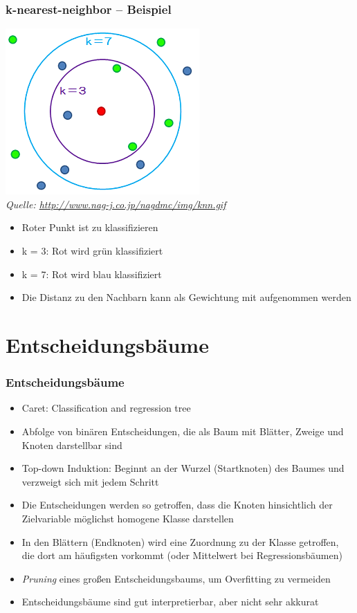 \documentclass{beamer}
\begin{document}
\begin{frame}
  \frametitle{k-nearest-neighbor -- Beispiel}  
\includegraphics[scale=.4]{knn.png} \\
\flushleft
\emph{\tiny Quelle: \url{http://www.nag-j.co.jp/nagdmc/img/knn.gif}}
\normalsize
 \begin{itemize}
  \item Roter Punkt ist zu klassifizieren
  \item k = 3: Rot wird grün klassifiziert 
  \item k = 7: Rot wird blau klassifiziert 
  \item Die Distanz zu den Nachbarn kann als Gewichtung mit aufgenommen werden
  \end{itemize}  
\end{frame}

\section{Entscheidungsbäume}

\begin{frame}
  \frametitle{Entscheidungsbäume}  
  \begin{itemize}
  \item Caret: Classification and regression tree
  \item Abfolge von binären Entscheidungen, die als Baum mit Blätter, Zweige und Knoten darstellbar sind
  \item Top-down Induktion: Beginnt an der Wurzel (Startknoten) des Baumes und verzweigt sich mit jedem Schritt
  \item Die Entscheidungen werden so getroffen, dass die Knoten hinsichtlich der Zielvariable möglichst homogene Klasse darstellen
  \item In den Blättern (Endknoten) wird eine Zuordnung zu der Klasse getroffen, die dort am häufigsten vorkommt (oder Mittelwert bei Regressionsbäumen)
   \item \emph{Pruning} eines großen Entscheidungsbaums, um Overfitting zu vermeiden
   \item Entscheidungsbäume sind gut interpretierbar, aber nicht sehr akkurat
 \end{itemize}  
\end{frame}
\end{document}
